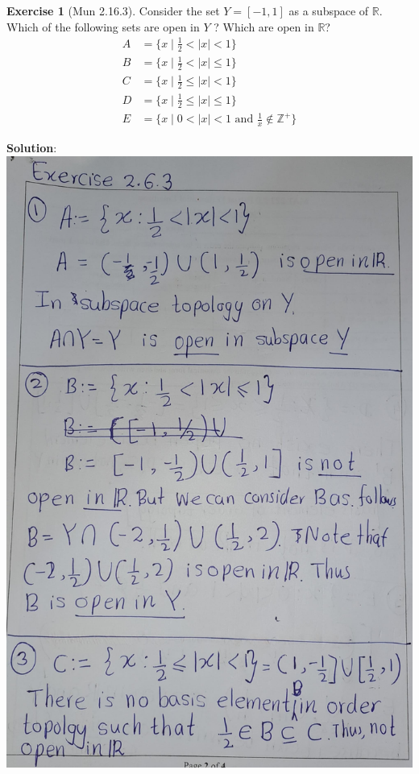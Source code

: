 \documentclass[
]{book}
\theoremstyle{definition}
\theoremstyle{definition}
\theoremstyle{definition}
\newtheorem{exercise}{Exercise}[chapter]
\theoremstyle{definition}
\theoremstyle{remark}
\begin{document}
\begin{exercise}[Mun 2.16.3]
\protect\hypertarget{exr:unnamed-chunk-86}{}\label{exr:unnamed-chunk-86}Consider the set \(Y = [−1, 1]\) as a subspace of \(\mathbb{R}\). Which of the following sets are open in \(Y\) ? Which are open in \(\mathbb{R}\)?
\begin{align}
A &= \{ x \mid \frac{1}{2} < |x| < 1 \}\\ 
B &= \{ x \mid \frac{1}{2} < |x| \leq 1 \} \\
C &= \{ x \mid \frac{1}{2} \leq |x| < 1 \}\\
D &= \{ x \mid \frac{1}{2} \leq |x| \leq 1 \}\\
E &= \{ x \mid 0 < |x| < 1 \text{ and } \frac{1}{x} \notin \mathbb{Z}^+ \}
\end{align}
\end{exercise}

\textbf{Solution}:
\includegraphics{figures/Exercises/Ex 2.16/ex 3-1.jpg}
\end{document}
